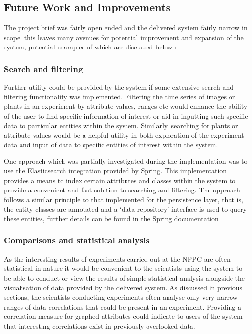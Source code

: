 \subsection{Future Work and Improvements}

The project brief was fairly open ended and the delivered system fairly narrow in scope, this leaves many avenues for potential improvement and expansion of the system, potential examples of which are discussed  below :

\subsubsection{Search and filtering}
Further utility could be provided by the system if some extensive search and filtering functionality was implemented. Filtering the time series of images or plants in an experiment by attribute values, ranges etc would enhance the ability of the user to find specific information of interest or aid in inputting such specific data to particular entities within the system. Similarly, searching for plants or attribute values would be a helpful utility in both exploration of the experiment data and input of data to specific entities of interest within the system.

One approach which was partially investigated during the implementation was to use the Elasticsearch\cite{elastic} integration provided by Spring. This implementation provides a means to index certain attributes and classes within the system to provide a convenient and fast solution to searching and filtering. The approach follows a similar principle to that implemented for the persistence layer, that is, the entity classes are annotated and a `data repository' interface is used to query these entities, further details can be found in the Spring documentation\cite{_spelastic}  


\subsubsection{Comparisons and statistical analysis}
As the interesting results of experiments carried out at the NPPC are often statistical in nature it would be convenient to the scientists using the system to be able to conduct or view the results of simple statistical analysis alongside the visualisation of data provided by the delivered system. As discussed in previous sections, the scientists conducting experiments often analyse only very narrow ranges of data correlations that could be present in an experiment. Providing a correlation measure for graphed attributes could indicate to users of the system that interesting correlations exist in previously overlooked data. 

